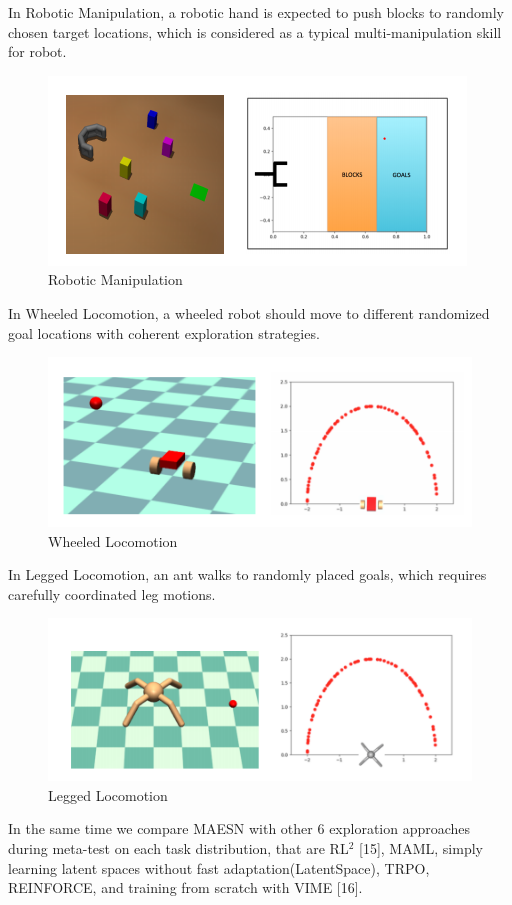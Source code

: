In Robotic Manipulation, a robotic hand is expected to push blocks to randomly chosen target locations, which is considered as a typical multi-manipulation skill for robot.
\begin{figure}[H]
	\includegraphics[scale=0.6]{MAESN_05.PNG}
	\centering
	\caption{Robotic Manipulation}
	\label{MAESN}
\end{figure}

In Wheeled Locomotion, a wheeled robot should move to different randomized goal locations with coherent exploration strategies.
\begin{figure}[H]
	\includegraphics[scale=0.53]{MAESN_06.PNG}
	\centering
	\caption{Wheeled Locomotion}
	\label{MAESN}
\end{figure}

In Legged Locomotion, an ant walks to randomly placed goals, which requires carefully coordinated leg motions.
\begin{figure}[H]
	\includegraphics[scale=0.53]{MAESN_07.PNG}
	\centering
	\caption{Legged Locomotion}
	\label{MAESN}
\end{figure}
In the same time we compare MAESN with other 6 exploration approaches during meta-test on each task distribution, that are RL$^2$ [15], MAML, simply learning latent spaces without fast adaptation(LatentSpace), TRPO, REINFORCE, and training from scratch with VIME [16]. 

